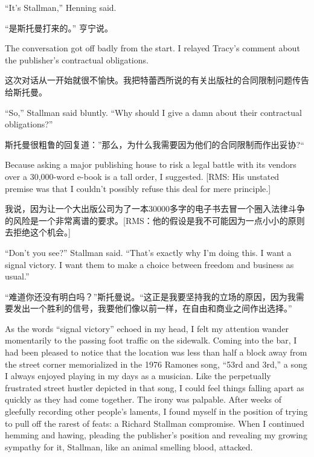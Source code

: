 \ifdefined\eng
``It's Stallman,'' Henning said.
\fi

\ifdefined\chs
“是斯托曼打来的。” 亨宁说。
\fi

\ifdefined\eng
The conversation got off badly from the start. I relayed Tracy's comment about the publisher's contractual obligations.
\fi

\ifdefined\chs
这次对话从一开始就很不愉快。我把特蕾西所说的有关出版社的合同限制问题传告给斯托曼。
\fi

\ifdefined\eng
``So,'' Stallman said bluntly. ``Why should I give a damn about their contractual obligations?''
\fi

\ifdefined\chs
斯托曼很粗鲁的回复道：”那么，为什么我需要因为他们的合同限制而作出妥协?“
\fi

\ifdefined\eng
Because asking a major publishing house to risk a legal battle with its vendors over a 30,000-word e-book is a tall order, I suggested. [RMS: His unstated premise was that I couldn't possibly refuse this deal for mere principle.]
\fi

\ifdefined\chs
我说，因为让一个大出版公司为了一本30000多字的电子书去冒一个圈入法律斗争的风险是一个非常离谱的要求。[RMS：他的假设是我不可能因为一点小小的原则去拒绝这个机会。]
\fi

\ifdefined\eng
``Don't you see?'' Stallman said. ``That's exactly why I'm doing this. I want a signal victory. I want them to make a choice between freedom and business as usual.''
\fi

\ifdefined\chs
“难道你还没有明白吗？”斯托曼说。“这正是我要坚持我的立场的原因，因为我需要发出一个胜利的信号，我要他们像以前一样，在自由和商业之间作出选择。”
\fi

\ifdefined\eng
As the words ``signal victory'' echoed in my head, I felt my attention wander momentarily to the passing foot traffic on the sidewalk. Coming into the bar, I had been pleased to notice that the location was less than half a block away from the street corner memorialized in the 1976 Ramones song, ``53rd and 3rd,'' a song I always enjoyed playing in my days as a musician. Like the perpetually frustrated street hustler depicted in that song, I could feel things falling apart as quickly as they had come together. The irony was palpable. After weeks of gleefully recording other people's laments, I found myself in the position of trying to pull off the rarest of feats: a Richard Stallman compromise. When I continued hemming and hawing, pleading the publisher's position and revealing my growing sympathy for it, Stallman, like an animal smelling blood, attacked. 
\fi

